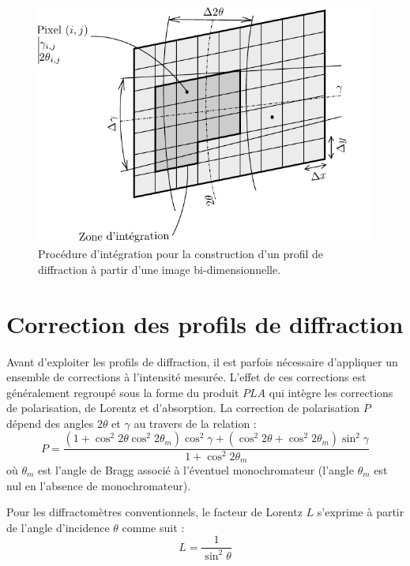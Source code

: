 \documentclass[french,a4paper]{report}
\begin{document}
\begin{figure}
\centering
\includegraphics{figures/detecteur.pdf}
\caption{Procédure d'intégration pour la construction d'un profil de diffraction à partir d'une image bi-dimensionnelle.}
\label{fig_detecteur}
\end{figure}

\section{Correction des profils de diffraction}

Avant d'exploiter les profils de diffraction, il est parfois nécessaire d'appliquer un ensemble de corrections à l'intensité mesurée. L'effet de ces corrections est généralement regroupé sous la forme du produit $PLA$ qui intègre les corrections de polarisation, de Lorentz et d'absorption. La correction de polarisation $P$ dépend des angles $2 \theta$ et $\gamma$ au travers de la relation :
\begin{equation}
P = \frac{\left( 1+\cos^2  2 \theta  \cos^2  2 \theta_m  \right) \cos^2 \gamma +\left( \cos^2  2 \theta  + \cos^2  2 \theta_m  \right) \sin^2 \gamma }{1+\cos^2  2 \theta_m }
\end{equation}
où $\theta_m$ est l'angle de Bragg associé à l'éventuel monochromateur (l'angle $\theta_m$ est nul en l'absence de monochromateur).

Pour les diffractomètres conventionnels, le facteur de Lorentz $L$ s'exprime à partir de l'angle d'incidence $\theta$ comme suit :
\begin{equation}
L = \frac{1}{ \sin^2  \theta  }
\end{equation}
\end{document}
